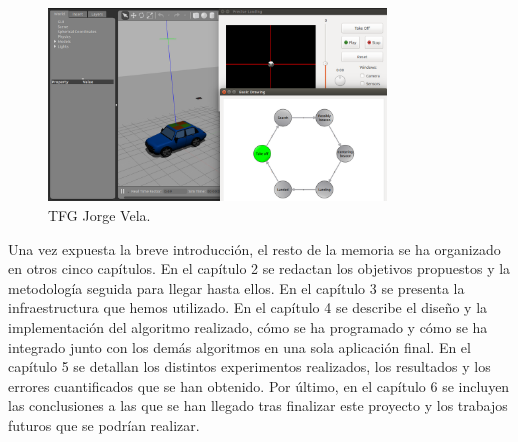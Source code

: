\begin{figure}[H]
	\begin{center}
		\includegraphics[width=0.8\textwidth]{imag/IMG50.png}
				\caption{TFG Jorge Vela.}
	\label{f:TFG Jorge Vela}	
	\end{center}
\end{figure}

\hspace{1cm} Una vez expuesta la breve introducción, el resto de la memoria se ha organizado en otros cinco capítulos. En el capítulo 2 se redactan los objetivos propuestos y la metodología seguida para llegar hasta ellos. En el capítulo 3 se presenta la infraestructura que hemos utilizado. En el capítulo 4 se describe el diseño y la implementación del algoritmo realizado, cómo se ha programado y cómo se ha integrado junto con los demás algoritmos en una sola aplicación final. En el capítulo 5 se detallan los distintos experimentos realizados, los resultados y los errores cuantificados que se han obtenido. Por último, en el capítulo 6 se incluyen las conclusiones a las que se han llegado tras finalizar este proyecto y los trabajos futuros que se podrían realizar.
